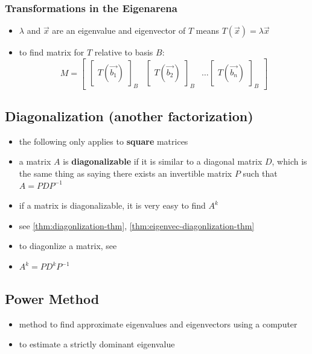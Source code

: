 \documentclass[a4paper,12pt]{article}
\theoremstyle{definition}
\theoremstyle{definition}
\newcommand{\basiscoord}[2]{
	\begin{bmatrix}
		#1
	\end{bmatrix}_#2
}
\begin{document}
	\subsubsection{Transformations in the Eigenarena}
	\begin{itemize}
		\item $\lambda$ and $\vec{x}$ are an eigenvalue and eigenvector of $T$ means $T(\vec{x}) = \lambda\vec{x}$
		
		\item to find matrix for $T$ relative to basis $B$:
		\begin{equation*}
			M =
			\begin{bmatrix}
				\basiscoord{T(\vec{b_1})}{B} & \basiscoord{T(\vec{b_2})}{B} & \ldots \basiscoord{T(\vec{b_n})}{B}
			\end{bmatrix}
		\end{equation*}
	\end{itemize}
	
	\subsection{Diagonalization (another factorization)}
	\begin{itemize}
		\item the following only applies to \textbf{square} matrices
		
		\item a matrix $A$ is \textbf{diagonalizable} if it is similar to a diagonal matrix $D$, which is the same thing as saying there exists an invertible matrix $P$ such that $A = PDP^{-1}$
		
		\item if a matrix is diagonalizable, it is very easy to find $A^k$
		
		\item see \autoref{thm:diagonlization-thm}, \autoref{thm:eigenvec-diagonlization-thm}
		
		\item to diagonlize a matrix, see 
		
		\item $A^k = PD^kP^{-1}$
	\end{itemize}
	
	\subsection{Power Method}
	\begin{itemize}
		\item method to find approximate eigenvalues and eigenvectors using a computer
		
		\item to estimate a strictly dominant eigenvalue 
	\end{itemize}
	
\end{document}
